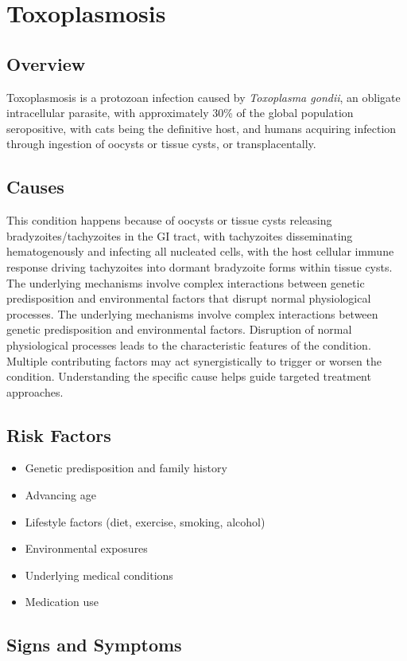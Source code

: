 \chapter{Toxoplasmosis}
\label{sec:Toxoplasmosis}

\section{Overview}
Toxoplasmosis is a protozoan infection caused by \textit{Toxoplasma gondii}, an obligate intracellular parasite, with approximately 30\% of the global population seropositive, with cats being the definitive host, and humans acquiring infection through ingestion of oocysts or tissue cysts, or transplacentally.
\section{Causes}
This condition happens because of oocysts or tissue cysts releasing bradyzoites/tachyzoites in the GI tract, with tachyzoites disseminating hematogenously and infecting all nucleated cells, with the host cellular immune response driving tachyzoites into dormant bradyzoite forms within tissue cysts. The underlying mechanisms involve complex interactions between genetic predisposition and environmental factors that disrupt normal physiological processes. The underlying mechanisms involve complex interactions between genetic predisposition and environmental factors. Disruption of normal physiological processes leads to the characteristic features of the condition. Multiple contributing factors may act synergistically to trigger or worsen the condition. Understanding the specific cause helps guide targeted treatment approaches.
\section{Risk Factors}


\begin{itemize}[noitemsep]
  \item Genetic predisposition and family history
  \item Advancing age
  \item Lifestyle factors (diet, exercise, smoking, alcohol)
  \item Environmental exposures
  \item Underlying medical conditions
  \item Medication use
\end{itemize}
\section{Signs and Symptoms}

